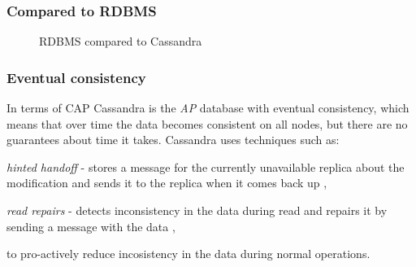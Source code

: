 \subsubsection{Compared to RDBMS}
\begin{figure}[hbt]
  \setlength{\unitlength}{1.3cm}  
  \caption{RDBMS compared to Cassandra}
  \label{fig:cassandraToRdbms}
\end{figure}

\subsubsection{Eventual consistency}\label{sec:theory:eventualConsistency}
In terms of CAP \cite{brewer2000towards} \cite{Brewer:2012ba} Cassandra is the \emph{AP} database with eventual consistency, which means that over time the data becomes consistent on all nodes, but there are no guarantees about time it takes. Cassandra uses techniques such as: \begin{enumerate*} 
\item \emph{hinted handoff} - stores a message for the currently unavailable replica about the modification and sends it to the replica when it comes back up \cite{CassandraHintedHandoff},  
\item \emph{read repairs} - detects inconsistency in the data during read and repairs it by sending a message with the data \cite{CassandraReadRepair},  \end{enumerate*} to pro-actively reduce incosistency in the data during normal operations.

